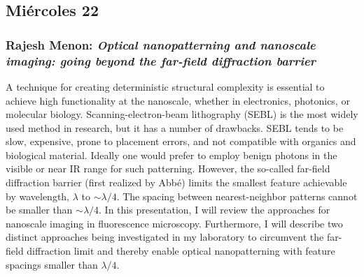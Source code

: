 % 
% 
% 
% 
% 
% 
    
\subsection*{Mi\'ercoles 22}

\subsubsection*{Rajesh Menon: \textit{Optical nanopatterning and nanoscale
imaging: going beyond the far-field diffraction barrier}}

A technique for creating deterministic structural complexity is essential to
achieve high functionality at the
nanoscale, whether in electronics, photonics, or molecular biology.
Scanning-electron-beam lithography (SEBL) is
the most widely used method in research, but it has a number of drawbacks. SEBL
tends to be slow, expensive,
prone to placement errors, and not compatible with organics and biological
material. Ideally one would prefer to
employ benign photons in the visible or near IR range for such patterning.
However, the so-called far-field
diffraction barrier (first realized by Abb\'e) limits the smallest feature
achievable by wavelength, $\lambda$ to $\sim \lambda / 4$. The
spacing between nearest-neighbor patterns cannot be smaller than $\sim \lambda /
4$.
In this presentation, I will review the approaches for nanoscale imaging in
fluorescence microscopy.
Furthermore, I will describe two distinct approaches being investigated in my
laboratory to circumvent the far-field
diffraction limit and thereby enable optical nanopatterning with feature
spacings smaller than $\lambda / 4$.


